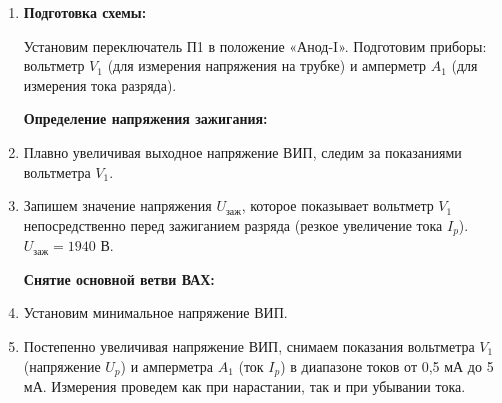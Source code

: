 \documentclass[a4paper]{article}
\begin{document}
\begin{enumerate}
\item \textbf{Подготовка схемы:}

     Установим переключатель П1 в положение «Анод-I». Подготовим приборы: вольтметр $V_1$ (для измерения напряжения на трубке) и амперметр $A_1$ (для измерения тока разряда).

\textbf{Определение напряжения зажигания:}
    \item Плавно увеличивая выходное напряжение ВИП, следим за показаниями вольтметра $V_1$.
        \item Запишем значение напряжения $U_{\text{заж}}$, которое показывает вольтметр $V_1$ непосредственно перед зажиганием разряда (резкое увеличение тока $I_p$). $U_{\text{заж}} = 1940$ В.

\textbf{Снятие основной ветви ВАХ:}
    \item Установим минимальное напряжение ВИП.
        \item Постепенно увеличивая напряжение ВИП, снимаем показания вольтметра $V_1$ (напряжение $U_p$) и амперметра $A_1$ (ток $I_p$) в диапазоне токов от 0,5 мА до 5 мА. Измерения проведем как при нарастании, так и при убывании тока.
\clearpage
\begin{table}[h!]
    \centering
    \begin{minipage}{0.48\textwidth}
        \centering
        

\end{minipage}
\end{table}
\end{enumerate}
\end{document}
